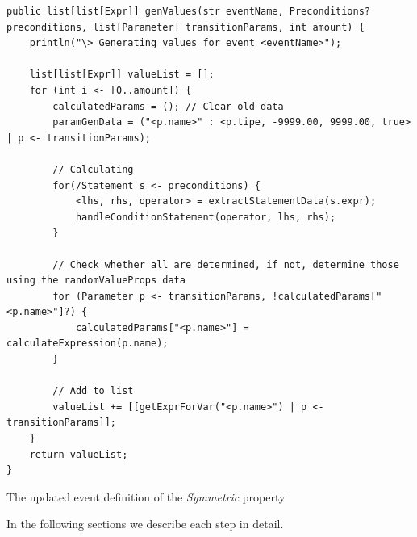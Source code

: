 \begin{sourcecode}[!ht]
\begin{lstlisting}[language=Rascal]
public list[list[Expr]] genValues(str eventName, Preconditions? preconditions, list[Parameter] transitionParams, int amount) {
    println("\> Generating values for event <eventName>");

    list[list[Expr]] valueList = [];
    for (int i <- [0..amount]) {
        calculatedParams = (); // Clear old data
        paramGenData = ("<p.name>" : <p.tipe, -9999.00, 9999.00, true> | p <- transitionParams);

        // Calculating
        for(/Statement s <- preconditions) {
            <lhs, rhs, operator> = extractStatementData(s.expr);
            handleConditionStatement(operator, lhs, rhs);
        }

        // Check whether all are determined, if not, determine those using the randomValueProps data
        for (Parameter p <- transitionParams, !calculatedParams["<p.name>"]?) {
            calculatedParams["<p.name>"] = calculateExpression(p.name);
        }

        // Add to list
        valueList += [[getExprForVar("<p.name>") | p <- transitionParams]];
    }
    return valueList;
}
\end{lstlisting}
\caption{The updated event definition of the \textit{Symmetric} property}
\label{lst:experiment3_value_generation_code}
\end{sourcecode}
\FloatBarrier

In the following sections we describe each step in detail.

